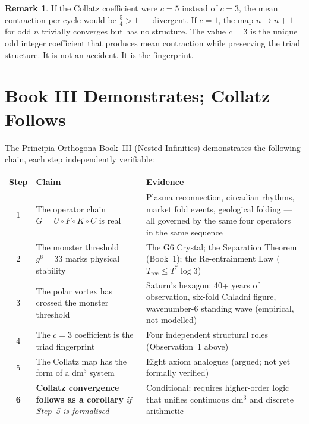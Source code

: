 \documentclass[11pt]{article}
\theoremstyle{plain}
\theoremstyle{definition}
\newtheorem{remark}{Remark}
\begin{document}
\begin{remark}
If the Collatz coefficient were $c = 5$ instead of $c = 3$, the mean
contraction per cycle would be $\frac{5}{4} > 1$ --- divergent.
If $c = 1$, the map $n \mapsto n+1$ for odd $n$ trivially converges
but has no structure. The value $c = 3$ is the unique odd integer
coefficient that produces mean contraction while preserving the triad
structure. It is not an accident. It is the fingerprint.
\end{remark}

\section{Book III Demonstrates; Collatz Follows}

The Principia Orthogona Book~III (Nested Infinities) demonstrates the
following chain, each step independently verifiable:

\medskip
\begin{center}
\renewcommand{\arraystretch}{1.6}
\begin{tabular}{@{}clp{7cm}@{}}
\toprule
\textbf{Step} & \textbf{Claim} & \textbf{Evidence} \\
\midrule
1 & The operator chain $G = U \circ F \circ K \circ C$ is real &
  Plasma reconnection, circadian rhythms, market fold events,
  geological folding --- all governed by the same four operators
  in the same sequence \\
2 & The monster threshold $g^6 = 33$ marks physical stability &
  The G6 Crystal; the Separation Theorem (Book~1);
  the Re-entrainment Law ($T_{\mathrm{rec}} \le T^* \log 3$) \\
3 & The polar vortex has crossed the monster threshold &
  Saturn's hexagon: 40+ years of observation, six-fold Chladni
  figure, wavenumber-6 standing wave (empirical, not modelled) \\
4 & The $c = 3$ coefficient is the triad fingerprint &
  Four independent structural roles (Observation~1 above) \\
5 & The Collatz map has the form of a dm$^3$ system &
  Eight axiom analogues (argued; not yet formally verified) \\
\midrule
\textbf{6} & \textbf{Collatz convergence follows as a corollary}
  \textit{if Step~5 is formalised} &
  Conditional: requires higher-order logic that unifies continuous
  dm$^3$ and discrete arithmetic \\
\bottomrule
\end{tabular}
\end{center}
\end{document}
